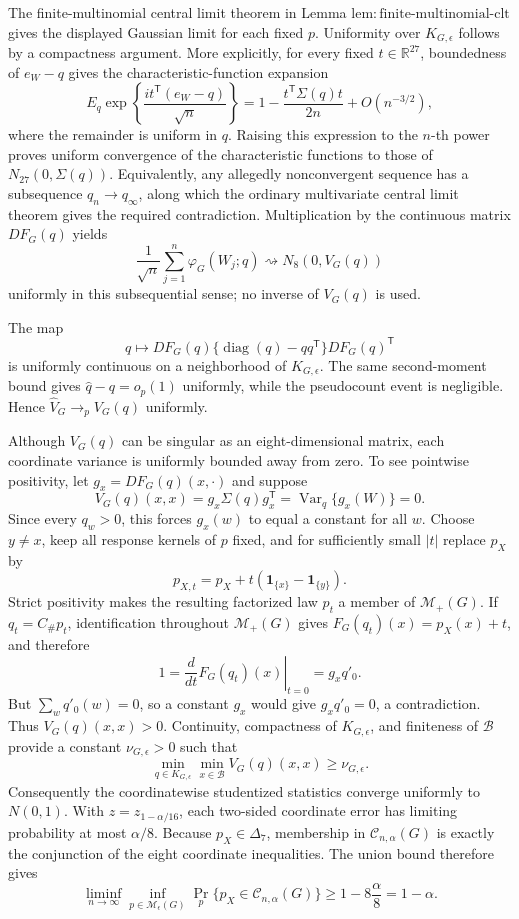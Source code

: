 The finite-multinomial central limit theorem in Lemma \(\mathrm{lem{:}finite\text{-}multinomial\text{-}clt}\) gives the displayed Gaussian limit for each fixed \(p\).  Uniformity over \(K_{G,\epsilon}\) follows by a compactness argument.  More explicitly, for every fixed \(t\in\mathbb R^{27}\), boundedness of \(e_W-q\) gives the characteristic-function expansion
\[
E_q\exp\!\left\{\frac{i t^{\mathsf T}(e_W-q)}{\sqrt n}\right\}
=1-\frac{t^{\mathsf T}\Sigma(q)t}{2n}+O(n^{-3/2}),
\]
where the remainder is uniform in \(q\).  Raising this expression to the \(n\)-th power proves uniform convergence of the characteristic functions to those of \(N_{27}(0,\Sigma(q))\).  Equivalently, any allegedly nonconvergent sequence has a subsequence \(q_n\to q_\infty\), along which the ordinary multivariate central limit theorem gives the required contradiction.  Multiplication by the continuous matrix \(D F_G(q)\) yields
\[
\frac1{\sqrt n}\sum_{j=1}^n\varphi_G(W_j;q)
\rightsquigarrow N_8(0,V_G(q))
\]
uniformly in this subsequential sense; no inverse of \(V_G(q)\) is used.

The map
\[
q\longmapsto D F_G(q)\{\operatorname{diag}(q)-qq^{\mathsf T}\}D F_G(q)^{\mathsf T}
\]
is uniformly continuous on a neighborhood of \(K_{G,\epsilon}\).  The same second-moment bound gives \(\widehat q-q=o_p(1)\) uniformly, while the pseudocount event is negligible.  Hence \(\widehat V_G\to_p V_G(q)\) uniformly.

Although \(V_G(q)\) can be singular as an eight-dimensional matrix, each coordinate variance is uniformly bounded away from zero.  To see pointwise positivity, let \(g_x=D F_G(q)(x,\cdot)\) and suppose
\[
V_G(q)(x,x)=g_x\Sigma(q)g_x^{\mathsf T}
=\operatorname{Var}_q\{g_x(W)\}=0.
\]
Since every \(q_w>0\), this forces \(g_x(w)\) to equal a constant for all \(w\).  Choose \(y\ne x\), keep all response kernels of \(p\) fixed, and for sufficiently small \(|t|\) replace \(p_X\) by
\[
p_{X,t}=p_X+t(\mathbf1_{\{x\}}-\mathbf1_{\{y\}}).
\]
Strict positivity makes the resulting factorized law \(p_t\) a member of \(\mathcal M_+(G)\).  If \(q_t=C_{\#}p_t\), identification throughout \(\mathcal M_+(G)\) gives \(F_G(q_t)(x)=p_X(x)+t\), and therefore
\[
1=\left.\frac{d}{dt}F_G(q_t)(x)\right|_{t=0}
=g_x q'_0.
\]
But \(\sum_wq'_0(w)=0\), so a constant \(g_x\) would give \(g_xq'_0=0\), a contradiction.  Thus \(V_G(q)(x,x)>0\).  Continuity, compactness of \(K_{G,\epsilon}\), and finiteness of \(\mathcal B\) provide a constant \(\nu_{G,\epsilon}>0\) such that
\[
\min_{q\in K_{G,\epsilon}}\min_{x\in\mathcal B}V_G(q)(x,x)\ge\nu_{G,\epsilon}.
\]
Consequently the coordinatewise studentized statistics converge uniformly to \(N(0,1)\).  With \(z=z_{1-\alpha/16}\), each two-sided coordinate error has limiting probability at most \(\alpha/8\).  Because \(p_X\in\Delta_7\), membership in \(\mathcal C_{n,\alpha}(G)\) is exactly the conjunction of the eight coordinate inequalities.  The union bound therefore gives
\[
\liminf_{n\to\infty}\inf_{p\in\mathcal M_\epsilon(G)}
\Pr_p\{p_X\in\mathcal C_{n,\alpha}(G)\}
\ge1-8\frac{\alpha}{8}=1-\alpha.
\]